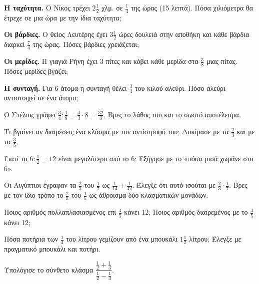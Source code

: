 \ex \textbf{Η ταχύτητα.} Ο Νίκος τρέχει $2\frac{1}{2}$ χλμ. σε $\frac{1}{4}$ της ώρας (15 λεπτά). Πόσα χιλιόμετρα θα έτρεχε σε μια ώρα με την ίδια ταχύτητα;

\ex \textbf{Οι βάρδιες.} Ο θείος Λευτέρης έχει $3\frac{1}{2}$ ώρες δουλειά στην αποθήκη και κάθε βάρδια διαρκεί $\frac{7}{4}$ της ώρας. Πόσες βάρδιες χρειάζεται;

\ex \textbf{Οι μερίδες.} Η γιαγιά Ρήνη έχει 3 πίτες και κόβει κάθε μερίδα στα $\frac{3}{8}$ μιας πίτας. Πόσες μερίδες βγάζει;

\ex \textbf{Η συνταγή.} Για 6 άτομα η συνταγή θέλει $\frac{3}{4}$ του κιλού αλεύρι. Πόσο αλεύρι αντιστοιχεί σε ένα άτομο;


\ex Ο Στέλιος γράφει $\frac{3}{4}:\frac{1}{8}=\frac{4}{3}\cdot 8=\frac{32}{3}$. Βρες το λάθος του και το σωστό αποτέλεσμα.

\ex Τι βγαίνει αν διαιρέσεις ένα κλάσμα με τον αντίστροφό του; Δοκίμασε με τα $\frac{2}{3}$ και με τα $\frac{3}{5}$.

\ex Γιατί το $6:\frac{1}{2}=12$ είναι μεγαλύτερο από το 6; Εξήγησε με το «πόσα μισά χωράνε στο 6».

\ex Οι Αιγύπτιοι έγραφαν τα $\frac{2}{3}$ του $\frac{1}{7}$ ως $\frac{1}{14}+\frac{1}{42}$. Έλεγξε ότι αυτό ισούται με $\frac{2}{3}\cdot\frac{1}{7}$. Βρες με τον ίδιο τρόπο το $\frac{2}{3}$ του $\frac{1}{5}$ ως άθροισμα δύο κλασματικών μονάδων.

\ex Ποιος αριθμός πολλαπλασιασμένος επί $\frac{4}{5}$ κάνει 12; Ποιος αριθμός διαιρεμένος με το $\frac{4}{5}$ κάνει 12;


\ex Πόσα ποτήρια των $\frac{1}{4}$ του λίτρου γεμίζουν από ένα μπουκάλι $1\frac{1}{2}$ λίτρου; Έλεγξε με πραγματικό μπουκάλι και ποτήρι.

\ex Υπολόγισε το σύνθετο κλάσμα $\dfrac{\frac{1}{2}+\frac{1}{3}}{\frac{1}{2}-\frac{1}{3}}$.

